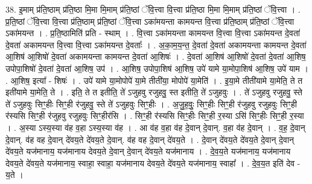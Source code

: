 \documentclass[17pt]{extarticle}
\begin{document}
38. इ॒माम् प्र॑ति॒ष्ठाम् प्र॑ति॒ष्ठा मि॒मा मि॒माम् प्र॑ति॒ष्ठां ॅवि॒त्त्वा वि॒त्त्वा प्र॑ति॒ष्ठा मि॒मा मि॒माम् प्र॑ति॒ष्ठां ॅवि॒त्त्वा । . प्र॒ति॒ष्ठां ॅवि॒त्त्वा वि॒त्त्वा प्र॑ति॒ष्ठाम् प्र॑ति॒ष्ठां ॅवि॒त्त्वा ऽका॑मयन्ता कामयन्त वि॒त्त्वा प्र॑ति॒ष्ठाम् प्र॑ति॒ष्ठां ॅवि॒त्त्वा ऽका॑मयन्त । . प्र॒ति॒ष्ठामिति॑ प्रति - स्थाम् । . वि॒त्त्वा ऽका॑मयन्ता कामयन्त वि॒त्त्वा वि॒त्त्वा ऽका॑मयन्त दे॒वता॑ दे॒वता॑ अकामयन्त वि॒त्त्वा वि॒त्त्वा ऽका॑मयन्त दे॒वताः᳚ । . अ॒का॒म॒य॒न्त॒ दे॒वता॑ दे॒वता॑ अकामयन्ता कामयन्त दे॒वता॑ आ॒शिष॑ आ॒शिषो॑ दे॒वता॑ अकामयन्ता कामयन्त दे॒वता॑ आ॒शिषः॑ । . दे॒वता॑ आ॒शिष॑ आ॒शिषो॑ दे॒वता॑ दे॒वता॑ आ॒शिष॒ उपोपा॒शिषो॑ दे॒वता॑ दे॒वता॑ आ॒शिष॒ उप॑ । . आ॒शिष॒ उपोपा॒शिष॑ आ॒शिष॒ उपे॑ यामे या॒मोपा॒शिष॑ आ॒शिष॒ उपे॑ याम । . आ॒शिष॒ इत्या᳚ - शिषः॑ । . उपे॑ यामे या॒मोपोपे॑ या॒मे तीती॑या॒ मोपोपे॑ या॒मेति॑ । . इ॒या॒मे तीती॑यामे या॒मेति॒ ते त इती॑यामे या॒मेति॒ ते । . इति॒ ते त इतीति॒ ते॑ ऽजुहवु रजुहवु॒ स्त इतीति॒ ते॑ ऽजुहवुः । . ते॑ ऽजुहवु रजुहवु॒ स्ते ते॑ ऽजुहवुः सिꣳ॒॒हीः सिꣳ॒॒ही र॑जुहवु॒ स्ते ते॑ ऽजुहवुः सिꣳ॒॒हीः । . अ॒जु॒ह॒वुः॒ सिꣳ॒॒हीः सिꣳ॒॒ही र॑जुहवु रजुहवुः सिꣳ॒॒ही र॑स्यसि सिꣳ॒॒ही र॑जुहवु रजुहवुः सिꣳ॒॒हीर॑सि । . सिꣳ॒॒ही र॑स्यसि सिꣳ॒॒हीः सिꣳ॒॒ही र॒स्या ऽसि॑ सिꣳ॒॒हीः सिꣳ॒॒ही र॒स्या । . अ॒स्या ऽस्य॒स्या व॑ह व॒हा ऽस्य॒स्या व॑ह । . आ व॑ह व॒हा व॑ह दे॒वान् दे॒वान्. व॒हा व॑ह दे॒वान् । . व॒ह॒ दे॒वान् दे॒वान्. व॑ह वह दे॒वान् दे॑वय॒ते दे॑वय॒ते दे॒वान्. व॑ह वह दे॒वान् दे॑वय॒ते । . दे॒वान् दे॑वय॒ते दे॑वय॒ते दे॒वान् दे॒वान् दे॑वय॒ते यज॑मानाय॒ यज॑मानाय देवय॒ते दे॒वान् दे॒वान् दे॑वय॒ते यज॑मानाय । . दे॒व॒य॒ते यज॑मानाय॒ यज॑मानाय देवय॒ते दे॑वय॒ते यज॑मानाय॒ स्वाहा॒ स्वाहा॒ यज॑मानाय देवय॒ते दे॑वय॒ते यज॑मानाय॒ स्वाहा᳚ । . दे॒व॒य॒त इति॑ देव - य॒ते । \newline
\pagebreak
{}
\end{document}
